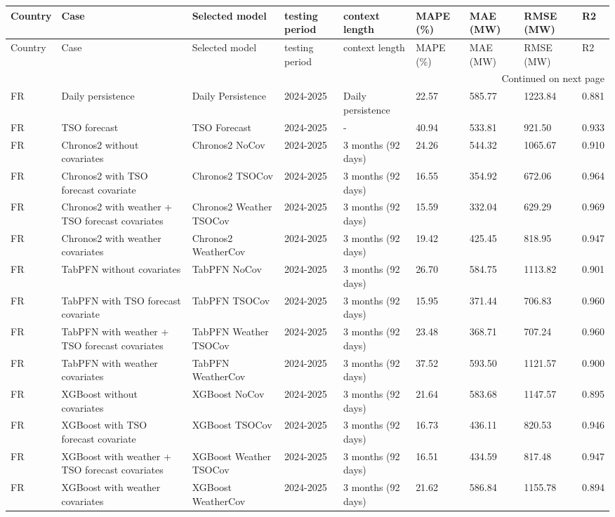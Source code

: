 \begin{longtable}{lllllllll}
\toprule
Country & Case & Selected model & testing period & context length & MAPE (\%) & MAE (MW) & RMSE (MW) & R2 \\
\midrule
\endfirsthead
\toprule
Country & Case & Selected model & testing period & context length & MAPE (\%) & MAE (MW) & RMSE (MW) & R2 \\
\midrule
\endhead
\midrule
\multicolumn{9}{r}{Continued on next page} \\
\midrule
\endfoot
\bottomrule
\endlastfoot
FR & Daily persistence & Daily Persistence & 2024-2025 & Daily persistence & 22.57 & 585.77 & 1223.84 & 0.881 \\
FR & TSO forecast & TSO Forecast & 2024-2025 & - & 40.94 & 533.81 & 921.50 & 0.933 \\
FR & Chronos2 without covariates & Chronos2 NoCov & 2024-2025 & 3 months (92 days) & 24.26 & 544.32 & 1065.67 & 0.910 \\
FR & Chronos2 with TSO forecast covariate & Chronos2 TSOCov & 2024-2025 & 3 months (92 days) & 16.55 & 354.92 & 672.06 & 0.964 \\
FR & Chronos2 with weather + TSO forecast covariates & Chronos2 Weather TSOCov & 2024-2025 & 3 months (92 days) & 15.59 & 332.04 & 629.29 & 0.969 \\
FR & Chronos2 with weather covariates & Chronos2 WeatherCov & 2024-2025 & 3 months (92 days) & 19.42 & 425.45 & 818.95 & 0.947 \\
FR & TabPFN without covariates & TabPFN NoCov & 2024-2025 & 3 months (92 days) & 26.70 & 584.75 & 1113.82 & 0.901 \\
FR & TabPFN with TSO forecast covariate & TabPFN TSOCov & 2024-2025 & 3 months (92 days) & 15.95 & 371.44 & 706.83 & 0.960 \\
FR & TabPFN with weather + TSO forecast covariates & TabPFN Weather TSOCov & 2024-2025 & 3 months (92 days) & 23.48 & 368.71 & 707.24 & 0.960 \\
FR & TabPFN with weather covariates & TabPFN WeatherCov & 2024-2025 & 3 months (92 days) & 37.52 & 593.50 & 1121.57 & 0.900 \\
FR & XGBoost without covariates & XGBoost NoCov & 2024-2025 & 3 months (92 days) & 21.64 & 583.68 & 1147.57 & 0.895 \\
FR & XGBoost with TSO forecast covariate & XGBoost TSOCov & 2024-2025 & 3 months (92 days) & 16.73 & 436.11 & 820.53 & 0.946 \\
FR & XGBoost with weather + TSO forecast covariates & XGBoost Weather TSOCov & 2024-2025 & 3 months (92 days) & 16.51 & 434.59 & 817.48 & 0.947 \\
FR & XGBoost with weather covariates & XGBoost WeatherCov & 2024-2025 & 3 months (92 days) & 21.62 & 586.84 & 1155.78 & 0.894 \\
\end{longtable}
